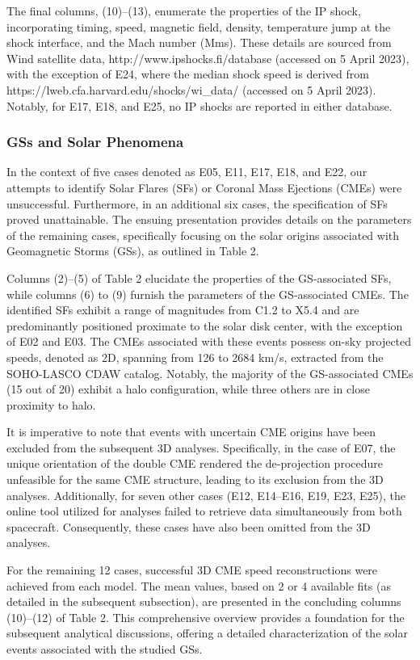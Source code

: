 The final columns, (10)–(13), enumerate the properties of the IP shock, incorporating timing, speed, magnetic field, density, temperature jump at the shock interface, and the Mach number (Mms). These details are sourced from Wind satellite data, http://www.ipshocks.fi/database (accessed on 5 April 2023), with the exception of E24, where the median shock speed is derived from https://lweb.cfa.harvard.edu/shocks/wi_data/ (accessed on 5 April 2023). Notably, for E17, E18, and E25, no IP shocks are reported in either database.

\subsubsection{GSs and Solar Phenomena}
In the context of five cases denoted as E05, E11, E17, E18, and E22, our attempts to identify Solar Flares (SFs) or Coronal Mass Ejections (CMEs) were unsuccessful. Furthermore, in an additional six cases, the specification of SFs proved unattainable. The ensuing presentation provides details on the parameters of the remaining cases, specifically focusing on the solar origins associated with Geomagnetic Storms (GSs), as outlined in Table 2.

Columns (2)–(5) of Table 2 elucidate the properties of the GS-associated SFs, while columns (6) to (9) furnish the parameters of the GS-associated CMEs. The identified SFs exhibit a range of magnitudes from C1.2 to X5.4 and are predominantly positioned proximate to the solar disk center, with the exception of E02 and E03. The CMEs associated with these events possess on-sky projected speeds, denoted as 2D, spanning from 126 to 2684 km/s, extracted from the SOHO-LASCO CDAW catalog. Notably, the majority of the GS-associated CMEs (15 out of 20) exhibit a halo configuration, while three others are in close proximity to halo.

It is imperative to note that events with uncertain CME origins have been excluded from the subsequent 3D analyses. Specifically, in the case of E07, the unique orientation of the double CME rendered the de-projection procedure unfeasible for the same CME structure, leading to its exclusion from the 3D analyses. Additionally, for seven other cases (E12, E14–E16, E19, E23, E25), the online tool utilized for analyses failed to retrieve data simultaneously from both spacecraft. Consequently, these cases have also been omitted from the 3D analyses.

For the remaining 12 cases, successful 3D CME speed reconstructions were achieved from each model. The mean values, based on 2 or 4 available fits (as detailed in the subsequent subsection), are presented in the concluding columns (10)–(12) of Table 2. This comprehensive overview provides a foundation for the subsequent analytical discussions, offering a detailed characterization of the solar events associated with the studied GSs.

